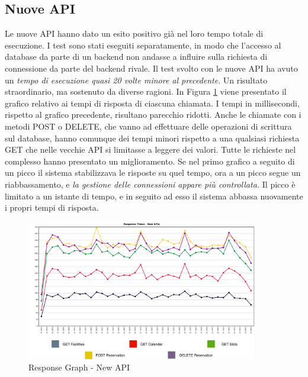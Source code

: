 \subsection{Nuove API}
Le nuove API hanno dato un esito positivo già nel loro tempo totale di esecuzione. I test sono stati eseguiti separatamente, in modo che l'accesso al database da parte di un backend non andasse a influire sulla richiesta di connessione da parte del backend rivale. Il test svolto con le nuove API ha avuto un \emph{tempo di esecuzione quasi 20 volte minore al precedente}. Un risultato straordinario, ma sostenuto da diverse ragioni. In Figura \ref{fig:newapi100t_response} viene presentato il grafico relativo ai tempi di risposta di ciascuna chiamata. I tempi in millisecondi, rispetto al grafico precedente, risultano parecchio ridotti. Anche le chiamate con i metodi POST o DELETE, che vanno ad effettuare delle operazioni di scrittura sul database, hanno comunque dei tempi minori rispetto a una qualsiasi richiesta GET che nelle vecchie API si limitasse a leggere dei valori. Tutte le richieste nel complesso hanno presentato un miglioramento. Se nel primo grafico a seguito di un picco il sistema stabilizzava le risposte su quel tempo, ora a un picco segue un riabbassamento, e \emph{la gestione delle connessioni appare più controllata.} Il picco è limitato a un istante di tempo, e in seguito ad esso il sistema abbassa nuovamente i propri tempi di risposta.
\begin{figure}
    \centering
    \includegraphics[width=0.90\textwidth]{images/04_3_new_api_response_graph_legend.pdf}
    \caption{Response Graph - New API}
    \label{fig:newapi100t_response}
\end{figure}
